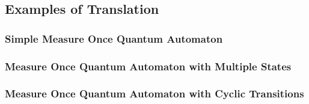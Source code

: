 \subsection{Examples of Translation}
\subsubsection{Simple Measure Once Quantum Automaton}
\subsubsection{Measure Once Quantum Automaton with Multiple States}
\subsubsection{Measure Once Quantum Automaton with Cyclic Transitions}